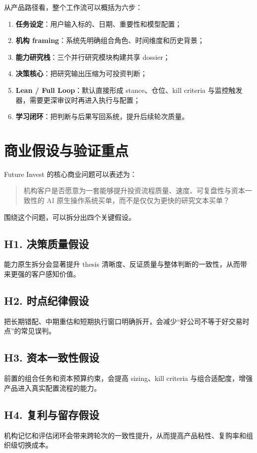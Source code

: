 \documentclass[11pt]{article}
\begin{document}
从产品路径看，整个工作流可以概括为六步：

\begin{enumerate}
\item \textbf{任务设定}：用户输入标的、日期、重要性和模型配置；
\item \textbf{机构 framing}：系统先明确组合角色、时间维度和历史背景；
\item \textbf{能力研究栈}：三个并行研究模块构建共享 dossier；
\item \textbf{决策核心}：把研究输出压缩为可投资判断；
\item \textbf{Lean / Full Loop}：默认直接形成 stance、仓位、kill criteria 与监控触发器，需要更深审议时再进入执行与配置；
\item \textbf{学习闭环}：把判断与后果写回系统，提升后续轮次质量。
\end{enumerate}

\section{商业假设与验证重点}

Future Invest 的核心商业问题可以表述为：

\begin{quote}
机构客户是否愿意为一套能够提升投资流程质量、速度、可复盘性与资本一致性的 AI 原生操作系统买单，而不是仅仅为更快的研究文本买单？
\end{quote}

围绕这个问题，可以拆分出四个关键假设。

\subsection*{H1. 决策质量假设}
能力原生拆分会显著提升 thesis 清晰度、反证质量与整体判断的一致性，从而带来更强的客户感知价值。

\subsection*{H2. 时点纪律假设}
把长期错配、中期重估和短期执行窗口明确拆开，会减少“好公司不等于好交易时点”的常见误判。

\subsection*{H3. 资本一致性假设}
前置的组合任务和资本预算约束，会提高 sizing、kill criteria 与组合适配度，增强产品进入真实配置流程的能力。

\subsection*{H4. 复利与留存假设}
机构记忆和评估闭环会带来跨轮次的一致性提升，从而提高产品粘性、复购率和组织级切换成本。
\end{document}
